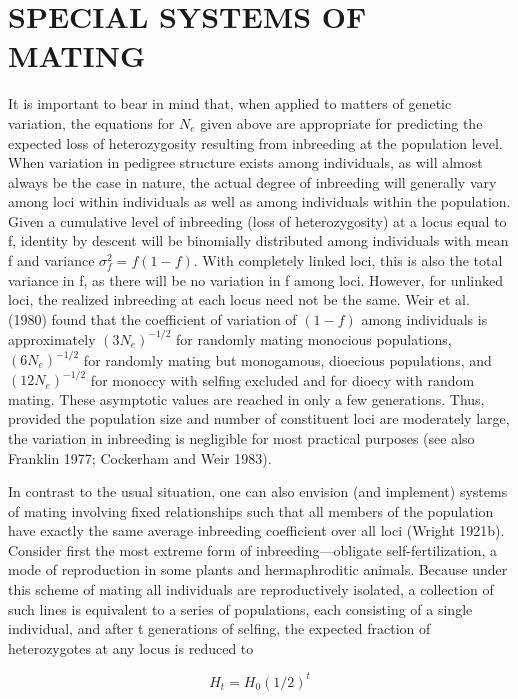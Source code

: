 \documentclass{article}
\begin{document}
\section{SPECIAL SYSTEMS OF MATING}
It is important to bear in mind that, when applied to matters of genetic variation, the equations for  $ N_e $ given above are appropriate for predicting the expected loss of heterozygosity resulting from inbreeding at the population level. When variation in pedigree structure exists among individuals, as will almost always be the case in nature, the actual degree of inbreeding will generally vary among loci within individuals as well as among individuals within the population. Given a cumulative level of inbreeding (loss of heterozygosity) at a locus equal to f, identity by descent will be binomially distributed among individuals with mean f and variance  $ \sigma_f^2 = f(1 - f) $. With completely linked loci, this is also the total variance in f, as there will be no variation in f among loci. However, for unlinked loci, the realized inbreeding at each locus need not be the same. Weir et al. (1980) found that the coefficient of variation of  $ (1 - f) $ among individuals is approximately  $ (3N_e)^{-1/2} $ for randomly mating monocious populations,  $ (6N_e)^{-1/2} $ for randomly mating but monogamous, dioecious populations, and  $ (12N_e)^{-1/2} $ for monoccy with selfing excluded and for dioecy with random mating. These asymptotic values are reached in only a few generations. Thus, provided the population size and number of constituent loci are moderately large, the variation in inbreeding is negligible for most practical purposes (see also Franklin 1977; Cockerham and Weir 1983).

In contrast to the usual situation, one can also envision (and implement) systems of mating involving fixed relationships such that all members of the population have exactly the same average inbreeding coefficient over all loci (Wright 1921b). Consider first the most extreme form of inbreeding—obligate self-fertilization, a mode of reproduction in some plants and hermaphroditic animals. Because under this scheme of mating all individuals are reproductively isolated, a collection of such lines is equivalent to a series of populations, each consisting of a single individual, and after t generations of selfing, the expected fraction of heterozygotes at any locus is reduced to

\begin{equation}
H_{t}=H_{0}(1/2)^{t}
\tag{3.22}
\label{eq:3_22}
\end{equation}
\end{document}
